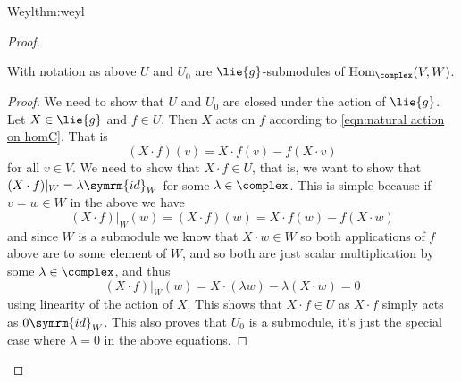 \documentclass[fleqn]{NotesClass}
\DeclareMathOperator{\Hom}{Hom}
\newcommand{\id}{\symrm{id}}
\begin{document}
\begin{thm}{Weyl}{thm:weyl}
\begin{proof}
            \begin{clm}{}{}
                With notation as above \(U\) and \(U_0\) are \(\lie{g}\)-submodules of \(\Hom_{\complex}(V, W)\).
                \begin{proof}
                    We need to show that \(U\) and \(U_0\) are closed under the action of \(\lie{g}\).
                    Let \(X \in \lie{g}\) and \(f \in U\).
                    Then \(X\) acts on \(f\) according to \cref{eqn:natural action on homC}.
                    That is
                    \begin{equation}
                        (X \cdot f)(v) = X \cdot f(v) - f(X \cdot v)
                    \end{equation}
                    for all \(v \in V\).
                    We need to show that \(X \cdot f \in U\), that is, we want to show that \((X \cdot f) |_W = \lambda \id_W\) for some \(\lambda \in \complex\).
                    This is simple because if \(v = w \in W\) in the above we have
                    \begin{equation}
                        (X \cdot f)|_W(w) = (X \cdot f)(w) = X \cdot f(w) - f(X \cdot w)
                    \end{equation}
                    and since \(W\) is a submodule we know that \(X \cdot w \in W\) so both applications of \(f\) above are to some element of \(W\), and so both are just scalar multiplication by some \(\lambda \in \complex\), and thus
                    \begin{equation}
                        (X \cdot f)|_W(w) = X \cdot (\lambda w) - \lambda(X \cdot w) = 0
                    \end{equation}
                    using linearity of the action of \(X\).
                    This shows that \(X \cdot f \in U\) as \(X \cdot f\) simply acts as \(0 \id_W\).
                    This also proves that \(U_0\) is a submodule, it's just the special case where \(\lambda = 0\) in the above equations.
                \end{proof}
            \end{clm}
            

\end{proof}
\end{thm}
\end{document}
